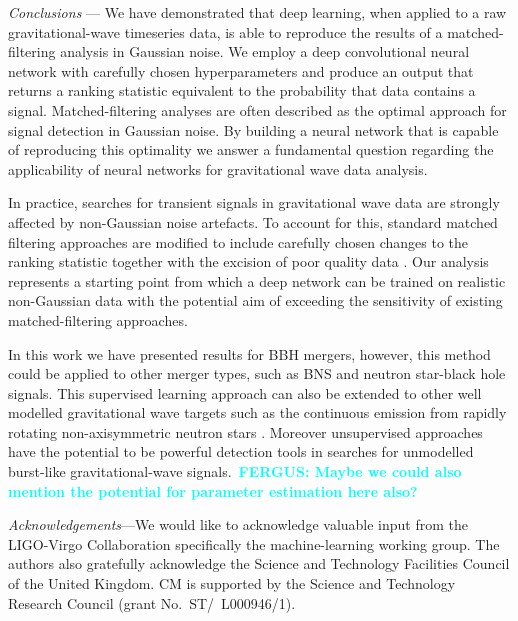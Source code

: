 \documentclass[%
showpacs,
 amsmath,amssymb,
 aps,
 twocolumn,
 prl,
 reprint,
floatfix,
]{revtex4-1}
\newcommand{\fergus}[1]{\textbf{\textcolor{cyan}{FERGUS: #1}}}
\begin{document}
%
%
\textit{Conclusions} --- 
%
%
We have demonstrated that deep learning, when applied to a raw
gravitational-wave timeseries data, is able to reproduce the results of a
matched-filtering analysis in Gaussian noise. We employ a deep convolutional
neural network with carefully chosen hyperparameters and produce an output that
returns a ranking statistic equivalent to the probability that data contains a
signal. Matched-filtering analyses are often described as the optimal approach for
signal detection in Gaussian noise. By building a neural network that is
capable of reproducing this optimality we answer a fundamental question
regarding the applicability of neural networks for gravitational wave data
analysis. 

%
%
In practice, searches for transient signals in gravitational wave data are
strongly affected by non-Gaussian noise artefacts. To account for this,
standard matched filtering approaches are modified to include carefully chosen
changes to the ranking statistic \cite{PhysRevD.71.062001,0004-637X-849-2-118} together with the excision of poor quality
data \cite{1710.02185, 0264-9381-33-13-134001}. Our analysis
represents a starting point from which a deep network can be trained on
realistic non-Gaussian data with the potential aim of exceeding the sensitivity
of existing matched-filtering approaches.

%
%
In this work we have presented results for \ac{BBH} mergers, however, this
method could be applied to other merger types, such as \ac{BNS} and neutron
star-black hole signals. This supervised learning approach can also be extended
to other well modelled gravitational wave targets such as the continuous
emission from rapidly rotating non-axisymmetric neutron stars \cite{1707.02669}. 
Moreover unsupervised approaches have the potential to be powerful detection tools 
in searches for unmodelled burst-like gravitational-wave signals.~\fergus{Maybe 
we could also mention the potential for parameter estimation here also?} 

%
%
\emph{Acknowledgements}---We would like to acknowledge valuable input from the
LIGO-Virgo Collaboration specifically the machine-learning working group. The
authors also gratefully acknowledge the Science and Technology Facilities
Council of the United Kingdom.  CM is supported by the Science and Technology
Research Council (grant No.~ST/~L000946/1).
%




\end{document}
